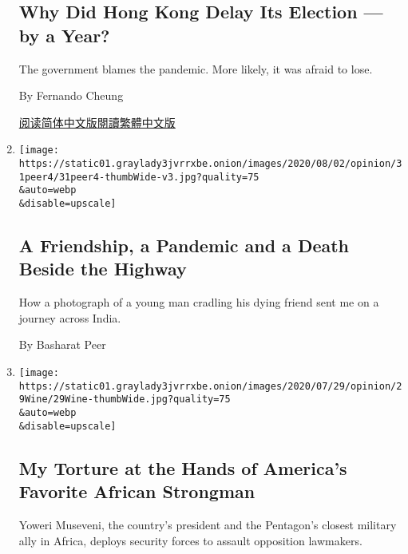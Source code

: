 \begin{enumerate}
  \hypertarget{why-did-hong-kong-delay-its-election--by-a-year}{%
  \subsection{Why Did Hong Kong Delay Its Election --- by a
  Year?}\label{why-did-hong-kong-delay-its-election--by-a-year}}

  The government blames the pandemic. More likely, it was afraid to
  lose.

  By Fernando Cheung

  \href{https://cn.nytimes3xbfgragh.onion/opinion/20200803/hong-kong-election-china/}{阅读简体中文版}\href{https://cn.nytimes3xbfgragh.onion/opinion/20200803/hong-kong-election-china/zh-hant/}{閱讀繁體中文版}
\item
  \href{/2020/07/31/opinion/sunday/India-migration-coronavirus.html}{}

  \texttt{[image: https://static01.graylady3jvrrxbe.onion/images/2020/08/02/opinion/31peer4/31peer4-thumbWide-v3.jpg?quality=75\\\&auto=webp\\\&disable=upscale]}

  \hypertarget{a-friendship-a-pandemic-and-a-death-beside-the-highway}{%
  \subsection{A Friendship, a Pandemic and a Death Beside the
  Highway}\label{a-friendship-a-pandemic-and-a-death-beside-the-highway}}

  How a photograph of a young man cradling his dying friend sent me on a
  journey across India.

  By Basharat Peer
\item
  \href{/2020/07/29/opinion/uganda-museveni-repression.html}{}

  \texttt{[image: https://static01.graylady3jvrrxbe.onion/images/2020/07/29/opinion/29Wine/29Wine-thumbWide.jpg?quality=75\\\&auto=webp\\\&disable=upscale]}

  \hypertarget{my-torture-at-the-hands-of-americas-favorite-african-strongman}{%
  \subsection{My Torture at the Hands of America's Favorite African
  Strongman}\label{my-torture-at-the-hands-of-americas-favorite-african-strongman}}

  Yoweri Museveni, the country's president and the Pentagon's closest
  military ally in Africa, deploys security forces to assault opposition
  lawmakers.


\end{enumerate}
